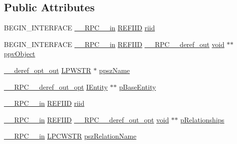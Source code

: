 \subsection*{Public Attributes}
\begin{DoxyCompactItemize}
\item 
B\+E\+G\+I\+N\+\_\+\+I\+N\+T\+E\+R\+F\+A\+CE \hyperlink{rpcsal_8h_a20b7f6da600a05c8b541659f14f7f0e6}{\+\_\+\+\_\+\+R\+P\+C\+\_\+\+\_\+in} \hyperlink{px__win__ds_8c_a80ec49c8ae61e234197d5071d2df497d}{R\+E\+F\+I\+ID} \hyperlink{struct_i_entity_vtbl_a4a6865cdfb04bc5ba92c56c6d360eeef}{riid}
\item 
B\+E\+G\+I\+N\+\_\+\+I\+N\+T\+E\+R\+F\+A\+CE \hyperlink{rpcsal_8h_a20b7f6da600a05c8b541659f14f7f0e6}{\+\_\+\+\_\+\+R\+P\+C\+\_\+\+\_\+in} \hyperlink{px__win__ds_8c_a80ec49c8ae61e234197d5071d2df497d}{R\+E\+F\+I\+ID} \hyperlink{rpcsal_8h_a23bc188526f10656f9c79d950f6c3192}{\+\_\+\+\_\+\+R\+P\+C\+\_\+\+\_\+deref\+\_\+out} \hyperlink{sound_8c_ae35f5844602719cf66324f4de2a658b3}{void} $\ast$$\ast$ \hyperlink{struct_i_entity_vtbl_ae26d0307d103c71d110222926f098d9a}{ppv\+Object}
\item 
\hyperlink{sal_8h_aca83a5a174d598aaeea78f024e4af103}{\+\_\+\+\_\+deref\+\_\+opt\+\_\+out} \hyperlink{mapinls_8h_acc28f72b93422cfd63a60e5a102a77b1}{L\+P\+W\+S\+TR} $\ast$ \hyperlink{struct_i_entity_vtbl_aff93fd576f7385df45b4ed44ecc5684a}{ppsz\+Name}
\item 
\hyperlink{rpcsal_8h_ab29e89ceb0eb0b075c6f6299b0de6a21}{\+\_\+\+\_\+\+R\+P\+C\+\_\+\+\_\+deref\+\_\+out\+\_\+opt} \hyperlink{structuredquery_8h_a9dd08456b6bfe208b5aa2ea5c533b490}{I\+Entity} $\ast$$\ast$ \hyperlink{struct_i_entity_vtbl_ae76ca5d36442b81aecf724bf081fe779}{p\+Base\+Entity}
\item 
\hyperlink{rpcsal_8h_a20b7f6da600a05c8b541659f14f7f0e6}{\+\_\+\+\_\+\+R\+P\+C\+\_\+\+\_\+in} \hyperlink{px__win__ds_8c_a80ec49c8ae61e234197d5071d2df497d}{R\+E\+F\+I\+ID} \hyperlink{struct_i_entity_vtbl_a4a6865cdfb04bc5ba92c56c6d360eeef}{riid}
\item 
\hyperlink{rpcsal_8h_a20b7f6da600a05c8b541659f14f7f0e6}{\+\_\+\+\_\+\+R\+P\+C\+\_\+\+\_\+in} \hyperlink{px__win__ds_8c_a80ec49c8ae61e234197d5071d2df497d}{R\+E\+F\+I\+ID} \hyperlink{rpcsal_8h_ab29e89ceb0eb0b075c6f6299b0de6a21}{\+\_\+\+\_\+\+R\+P\+C\+\_\+\+\_\+deref\+\_\+out\+\_\+opt} \hyperlink{sound_8c_ae35f5844602719cf66324f4de2a658b3}{void} $\ast$$\ast$ \hyperlink{struct_i_entity_vtbl_adaacc2095df5e2ba3143f85cffdd569d}{p\+Relationships}
\item 
\hyperlink{rpcsal_8h_a20b7f6da600a05c8b541659f14f7f0e6}{\+\_\+\+\_\+\+R\+P\+C\+\_\+\+\_\+in} \hyperlink{mapinls_8h_a25fda90f83ded0efd5456a4e7eda1e0c}{L\+P\+C\+W\+S\+TR} \hyperlink{struct_i_entity_vtbl_a128c7c88f8a9b01cb371ef1ae61f9b7c}{psz\+Relation\+Name}
$$
\end{DoxyCompactItemize}

